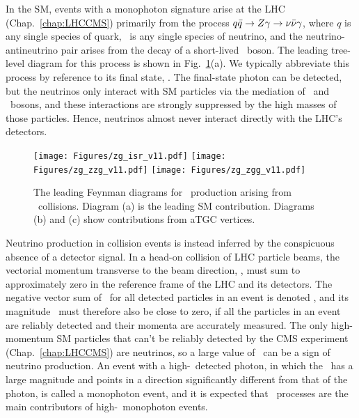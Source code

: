 In the SM, events with a monophoton signature arise at the LHC (Chap.~\ref{chap:LHCCMS}) primarily from the process $q\bar{q} \to Z\gamma \to \nu\bar{\nu}\gamma$,
where $q$ is any single species of quark, \Pn\ is any single species of neutrino, and the neutrino-antineutrino pair arises from the decay
of a short-lived \PZ\ boson. The leading tree-level diagram for this process is shown in Fig.~\ref{fig:zinvg_diagrams}(a). We typically abbreviate this process by
reference to its final state, \zinvg. The final-state photon can be detected, but the neutrinos only interact with SM particles via the mediation
of \PZ\ and \PW\ bosons, and these interactions are strongly suppressed by the high masses of those particles. Hence, neutrinos almost never interact directly with the LHC's detectors.

\begin{figure}[htb]
  \begin{center}
    \texttt{[image: Figures/zg\_isr\_v11.pdf]}
    \texttt{[image: Figures/zg\_zzg\_v11.pdf]}
    \texttt{[image: Figures/zg\_zgg\_v11.pdf]}
    \caption{
      The leading Feynman diagrams for \zinvg\ production arising from \Pp\Pp\ collisions. Diagram (a) is the leading SM contribution.
      Diagrams (b) and (c) show contributions from aTGC vertices.
    }
    \label{fig:zinvg_diagrams}
  \end{center}
\end{figure}

Neutrino production in collision events is instead inferred by the conspicuous absence of a detector signal.
In a head-on collision of LHC particle beams, the vectorial momentum transverse to the beam direction, \vecpT, must sum to approximately zero in the reference frame of the
LHC and its detectors. The negative vector sum of \vecpT\ for all detected particles in an event is denoted \vecMET, and its magnitude \MET\ must therefore also be close
to zero, if all the particles in an event are reliably detected and their momenta are accurately measured. The only high-momentum SM particles that can't
be reliably detected by the CMS experiment (Chap.~\ref{chap:LHCCMS}) are neutrinos, so a large value of \MET\ can be a sign of neutrino production. An event with a high-\pT\ detected photon, in which
the \vecMET\ has a large magnitude and points in a direction significantly different from that of the photon, is called a monophoton event, and it is
expected that \zinvg\ processes are the main contributors of high-\pT\ monophoton events.


